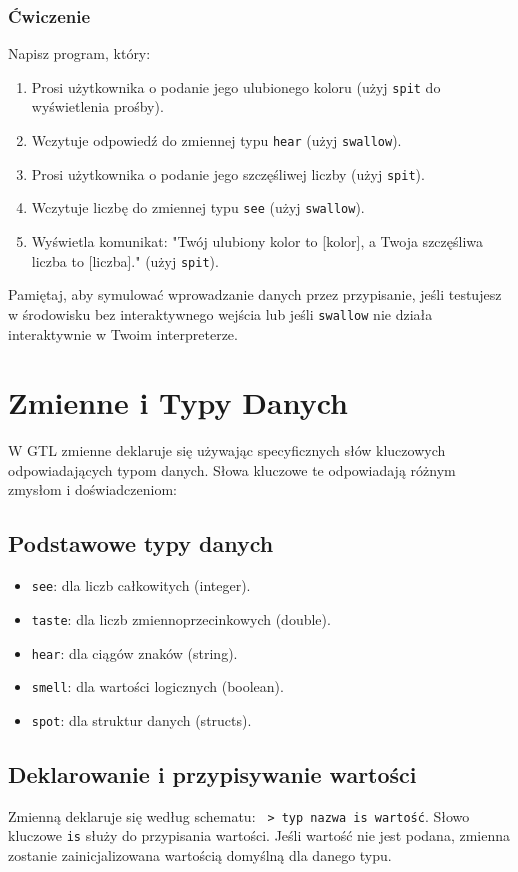 \documentclass[12pt,a4paper]{article}
\begin{document}
\subsubsection*{Ćwiczenie}
Napisz program, który:
\begin{enumerate}
    \item Prosi użytkownika o podanie jego ulubionego koloru (użyj \texttt{spit} do wyświetlenia prośby).
    \item Wczytuje odpowiedź do zmiennej typu \texttt{hear} (użyj \texttt{swallow}).
    \item Prosi użytkownika o podanie jego szczęśliwej liczby (użyj \texttt{spit}).
    \item Wczytuje liczbę do zmiennej typu \texttt{see} (użyj \texttt{swallow}).
    \item Wyświetla komunikat: "Twój ulubiony kolor to [kolor], a Twoja szczęśliwa liczba to [liczba]." (użyj \texttt{spit}).
\end{enumerate}
Pamiętaj, aby symulować wprowadzanie danych przez przypisanie, jeśli testujesz w środowisku bez interaktywnego wejścia lub jeśli \texttt{swallow} nie działa interaktywnie w Twoim interpreterze.

\newpage
\section{Zmienne i Typy Danych}
\label{sec:variables}
W GTL zmienne deklaruje się używając specyficznych słów kluczowych odpowiadających typom danych. Słowa kluczowe te odpowiadają różnym zmysłom i doświadczeniom:

\subsection{Podstawowe typy danych}
\begin{itemize}
    \item \texttt{see}: dla liczb całkowitych (integer).
    \item \texttt{taste}: dla liczb zmiennoprzecinkowych (double).
    \item \texttt{hear}: dla ciągów znaków (string).
    \item \texttt{smell}: dla wartości logicznych (boolean).
    \item \texttt{spot}: dla struktur danych (structs).
\end{itemize}

\subsection{Deklarowanie i przypisywanie wartości}
Zmienną deklaruje się według schematu: \texttt{ > {typ} {nazwa} is {wartość}}. Słowo kluczowe \texttt{is} służy do przypisania wartości. Jeśli wartość nie jest podana, zmienna zostanie zainicjalizowana wartością domyślną dla danego typu.
\end{document}
